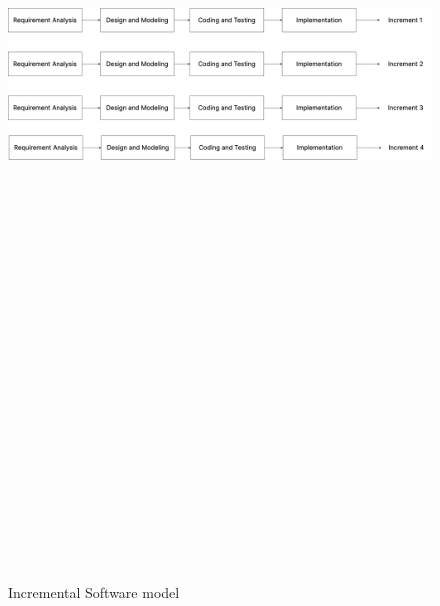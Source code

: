 \documentclass[a4paper,12pt]{article}
\begin{document}
{{{		\begin{figure}[h]
			\centering
			\includegraphics[width=6in, height=10in, keepaspectratio]{incremental.png}
			\label{incremental}
			\caption{Incremental Software model}
		\end{figure}
								
		
	
}}}
\end{document}
